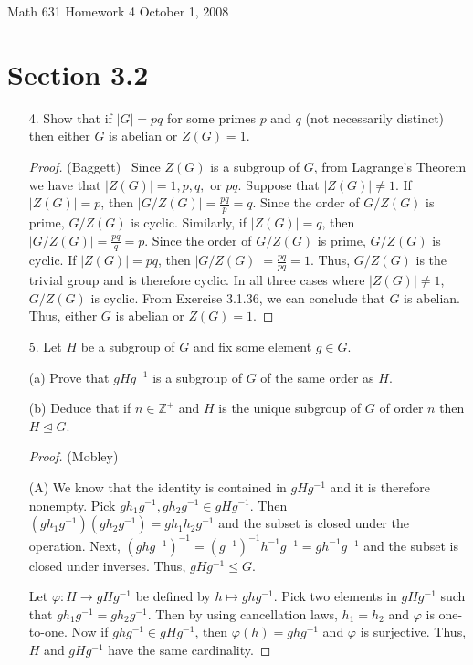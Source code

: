 \documentclass[10pt]{article}
\newcommand{\Z}{\mathbb{Z}}
\renewcommand{\phi}{\varphi}
\newcommand\header{\sc Math 631 \hfill Homework 4 \hfill October 1, 2008}
\begin{document}
\header

\section*{Section 3.2}

\begin{itemize}

\item[4.] Show that if $|G| = pq$ for some primes $p$ and $q$ (not necessarily distinct) then either
$G$ is abelian or $Z(G) = 1$.

\begin{proof}(Baggett) \ Since $Z(G)$ is a subgroup of $G$,
from Lagrange's Theorem we have that $|Z(G)| = 1, p, q,$ or $pq$.
Suppose that $|Z(G)| \neq 1$. If $|Z(G)| = p$, then $|G/Z(G)| =
\frac{pq}{p} = q$. Since the order of $G/Z(G)$ is prime, $G/Z(G)$ is
cyclic. Similarly, if $|Z(G)| = q$, then $|G/Z(G)| = \frac{pq}{q} =
p$. Since the order of $G/Z(G)$ is prime, $G/Z(G)$ is cyclic. If
$|Z(G)| = pq$, then $|G/Z(G)| = \frac{pq}{pq} = 1$. Thus, $G/Z(G)$
is the trivial group and is therefore cyclic. In all three cases
where $|Z(G)| \neq 1$, $G/Z(G)$ is cyclic. From Exercise 3.1.36, we
can conclude that $G$ is abelian. Thus, either $G$ is abelian or
$Z(G) = 1$.
\end{proof}

\item[5.]  Let $H$ be a subgroup of $G$ and fix some element $g\in G$.

(a)  Prove that $gHg^{-1}$ is a subgroup of $G$ of the same order as
$H$.

(b)  Deduce that if $n\in \Z^{+}$ and $H$ is the unique subgroup of
$G$ of order $n$ then $H\unlhd G$.

\begin{proof}(Mobley) 

(A) We know that the identity is contained in $gHg^{-1}$ and it is
therefore nonempty. Pick $gh_{1}g^{-1}, gh_{2}g^{-1} \in gHg^{-1}$.
Then $(gh_{1}g^{-1})(gh_{2}g^{-1})=gh_{1}h_{2}g^{-1}$ and the subset
is closed under the operation.  Next,
$(ghg^{-1})^{-1}=(g^{-1})^{-1}h^{-1}g^{-1}=gh^{-1}g^{-1}$ and the
subset is closed under inverses.  Thus, $gHg^{-1}\leq G$.

\smallskip

Let $\phi: H \rightarrow gHg^{-1}$ be defined by $h \mapsto ghg^{-1}$.  
Pick two elements in $gHg^{-1}$ such
that $gh_1g^{-1}=gh_2g^{-1}$.  Then by using cancellation laws,
$h_1=h_2$ and $\phi$ is one-to-one.  Now if $ghg^{-1} \in gHg^{-1}$,
then $\phi(h) = g h g^{-1}$ and $\phi$ is surjective.  Thus, $H$ and
$gHg^{-1}$ have the same cardinality.


\end{proof}
\end{itemize}
\end{document}
